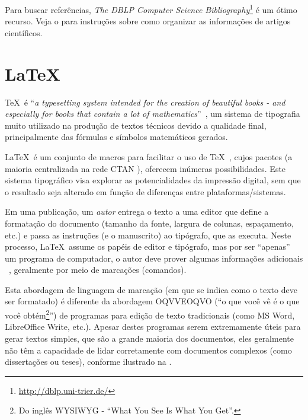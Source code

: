 Para buscar referências, \emph{The DBLP Computer Science Bibliography}\footnote{\url{http://dblp.uni-trier.de/}}
é um ótimo recurso. Veja o  para instruções
sobre como organizar as informações de artigos científicos.


\section{\LaTeX}%

\TeX\ é ``\emph{a typesetting system intended for the creation of beautiful books
 - and especially for books that contain a lot of mathematics}''~\cite{Knuth_1986_texbook},
 um sistema de tipografia muito utilizado na produção de textos técnicos devido
 a qualidade final, principalmente das fórmulas e símbolos matemáticos gerados.

\LaTeX\ é um conjunto de macros para facilitar o uso de \TeX~\cite{lamport_latex:_1994,},
cujos pacotes (a maioria centralizada na rede \acrshort{CTAN} \cite{greenwade93}), oferecem
inúmeras possibilidades. Este sistema tipográfico visa explorar as potencialidades
da impressão digital, sem que o resultado seja alterado em função de diferenças
entre plataformas/sistemas.

Em uma publicação, um \emph{autor} entrega o texto a uma editor que define a
formatação do documento (tamanho da fonte, largura de colunas, espaçamento, etc.)
e passa as instruções (e o manuscrito) ao tipógrafo, que as executa. Neste processo,
\LaTeX\ assume os papéis de editor e tipógrafo, mas por ser ``apenas'' um programa
de computador, o autor deve prover algumas informações adicionais ~\cite{Oetiker_1995_notsoshort},
geralmente por meio de marcações (comandos).

Esta abordagem de linguagem de marcação (em que se indica como o texto deve ser
formatado) é diferente da abordagem OQVVEOQVO (``o que você vê é o que você
obtém\footnote{Do inglês WYSIWYG - ``What You See Is What You Get''.}'') de programas
para edição de texto tradicionais (como MS Word, LibreOffice Write, etc.).
Apesar destes programas serem extremamente úteis para gerar textos simples, que
são a grande maioria dos documentos, eles geralmente não têm a capacidade de lidar
corretamente com documentos complexos (como dissertações ou teses), conforme ilustrado
na .%


